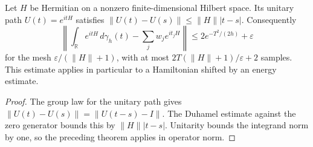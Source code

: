 \begin{lemma}
    \label{thm:huang_unitary_quadrature}
    \leanok
    Let $H$ be Hermitian on a nonzero finite-dimensional Hilbert space. Its unitary path
    $U(t)=e^{itH}$ satisfies $\|U(t)-U(s)\|\le\|H\||t-s|$. Consequently
    \[
        \left\|\int_{\mathbb R} e^{itH}\,d\gamma_h(t)-\sum_jw_je^{it_jH}\right\|
        \le2e^{-T^2/(2h)}+\varepsilon
    \]
    for the mesh $\varepsilon/(\|H\|+1)$, with at most
    $2T(\|H\|+1)/\varepsilon+2$ samples. This estimate applies in particular to a
    Hamiltonian shifted by an energy estimate.
\end{lemma}
\begin{proof}
    \leanok
    The group law for the unitary path gives
    $\|U(t)-U(s)\|=\|U(t-s)-I\|$. The Duhamel estimate against the zero generator
    bounds this by $\|H\||t-s|$. Unitarity bounds the integrand norm by one, so the
    preceding theorem applies in operator norm.
\end{proof}
